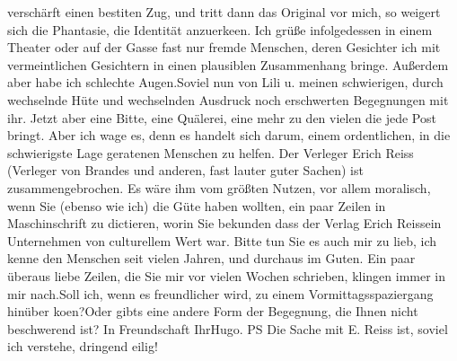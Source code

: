 \begin{ledgroupsized}[t]{13cm}
               verschärft einen besti{\geminationm}ten Zug, und tritt dann das
               Original vor mich, so weigert sich die Phantasie, die Identität anzuerke{\geminationn}en. Ich grüße infolgedessen in einem Theater oder auf
               der Gasse fast nur fremde Menschen, deren Gesichter ich mit vermeintlichen Gesichtern
               in einen plausiblen {\pb}Zusammenhang
               bringe. Außerdem aber habe ich schlechte Augen.\hspace*{1.5em}Soviel nun von Lili u. meinen schwierigen, durch
               wechselnde Hüte und wechselnden Ausdruck noch erschwerten Begegnungen mit ihr. Jetzt
               aber eine Bitte, eine Quälerei, eine mehr zu den vielen die jede Post bringt. Aber
               ich wage es, denn es handelt sich darum, einem ordentlichen, in die schwierigste Lage
               geratenen Menschen zu helfen. Der Verleger Erich
                  Reiss (Verleger von Brandes und anderen,
               fast lauter guter Sachen) ist zusammengebrochen. Es wäre ihm vom größten Nutzen, vor
               allem moralisch, wenn Sie (ebenso wie ich) die Güte haben wollten, ein paar Zeilen in
               Maschinschrift zu dictieren, worin Sie bekunden dass der Verlag Erich Reissein Unternehmen von culturellem
               Wert war.\pend
           \pstart
           Bitte tun Sie es auch mir zu lieb, ich kenne den Menschen seit vielen Jahren, und
               durchaus im Guten.\pend
           \pstart
           Ein paar überaus liebe Zeilen, die Sie mir vor vielen Wochen schrieben, klingen immer
               in mir nach.\hspace*{1.5em}Soll ich, wenn es freundlicher wird, zu
               einem Vormittagsspaziergang hinüber ko{\geminationm}en?\hspace*{1.5em}Oder gibts eine andere Form der Begegnung, die Ihnen
               nicht beschwerend ist? \pend
           \pstart In Freundschaft Ihr\spacefill\mbox{Hugo.}\pend{}\pstart
           \noindent{}PS Die Sache mit E. Reiss ist, soviel ich
                  verstehe, dringend eilig!\pend
           
         
         \endnumbering{}\end{ledgroupsized}  \newcommand{\dateiname}{L02466}\newcommand{\titel}{Hugo Hofmannsthal an Arthur Schnitzler, 9. 3. [1926]}\newcommand{\editorInnen}{Martin Anton Müller und Gerd-Hermann Susen}
      
